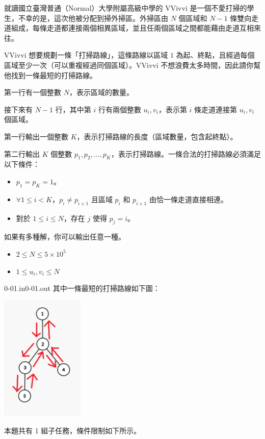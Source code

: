 
\ProblemStatement

就讀國立臺灣普通（Normal）大學附屬高級中學的 VVivvi 是一個不愛打掃的學生，不幸的是，這次他被分配到掃外掃區。外掃區由 $N$ 個區域和 $N-1$ 條雙向走道組成，每條走道都連接兩個相異區域，並且任兩個區域之間都能藉由走道互相來往。

VVivvi 想要規劃一條「打掃路線」，這條路線以區域 $1$ 為起、終點，且經過每個區域至少一次（可以重複經過同個區域）。VVivvi 不想浪費太多時間，因此請你幫他找到一條最短的打掃路線。

\ProblemInput

第一行有一個整數 $N$，表示區域的數量。

接下來有 $N-1$ 行，其中第 $i$ 行有兩個整數 $u_i,v_i$，表示第 $i$ 條走道連接第 $u_i,v_i$ 個區域。

\ProblemOutput

第一行輸出一個整數 $K$，表示打掃路線的長度（區域數量，包含起終點）。

第二行輸出 $K$ 個整數 $p_1,p_2,\dots,p_K$，表示打掃路線。一條合法的打掃路線必須滿足以下條件：

\begin{itemize}
    \item $p_1=p_K=1$。
    \item $\forall 1 \leq i < K$，$p_i \neq p_{i+1}$ 且區域 $p_i$ 和 $p_{i+1}$ 由恰一條走道直接相連。
    \item 對於 $1 \leq i \leq N$，存在 $j$ 使得 $p_j=i$。
\end{itemize}

如果有多種解，你可以輸出任意一種。

\clearpage

\ProblemConstraints

\begin{itemize}
    \item $2 \leq N \leq 5 \times 10^5$
    \item $1 \leq u_i,v_i \leq N$
\end{itemize}

\ProblemSampleTitle

\begin{ProblemSampleWithNote}{0-01.in}{0-01.out}
    其中一條最短的打掃路線如下圖：
    \begin{center}
        \includegraphics[width=0.3\textwidth]{pic.png}
    \end{center}
\end{ProblemSampleWithNote}


\clearpage

\ProblemSubtaskTitle

本題共有 1 組子任務，條件限制如下所示。

\begin{ProblemSubtaskTable}
\end{ProblemSubtaskTable}